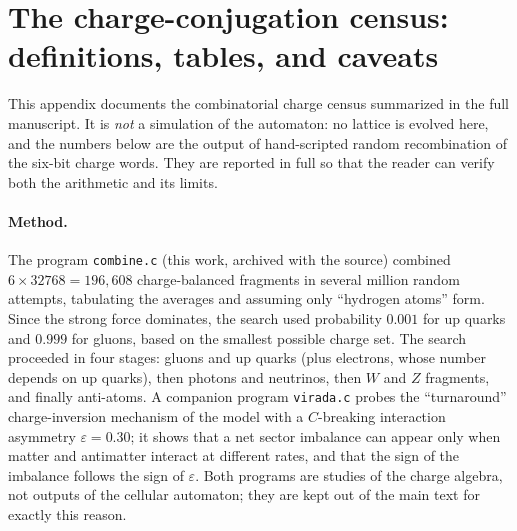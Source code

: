\documentclass{ijuc}
\begin{document}
\section{The charge-conjugation census: definitions, tables, and caveats\label{sec:charge-census-appendix}}
This appendix documents the combinatorial charge census summarized in the full manuscript.  It is \emph{not} a simulation of the automaton: no lattice is evolved here, and the numbers below are the output of hand-scripted random recombination of the six-bit charge words.  They are reported in full so that the reader can verify both the arithmetic and its limits.
\paragraph{Method.} The program \texttt{combine.c} (this work, archived with the source) combined $6\times32768=196{,}608$ charge-balanced fragments in several million random attempts, tabulating the averages and assuming only ``hydrogen atoms'' form.  Since the strong force dominates, the search used probability $0.001$ for up quarks and $0.999$ for gluons, based on the smallest possible charge set.  The search proceeded in four stages: gluons and up quarks (plus electrons, whose number depends on up quarks), then photons and neutrinos, then $W$ and $Z$ fragments, and finally anti-atoms.  A companion program \texttt{virada.c} probes the ``turnaround'' charge-inversion mechanism of the model with a $C$-breaking interaction asymmetry $\varepsilon=0.30$; it shows that a net sector imbalance can appear only when matter and antimatter interact at different rates, and that the sign of the imbalance follows the sign of $\varepsilon$.  Both programs are studies of the charge algebra, not outputs of the cellular automaton; they are kept out of the main text for exactly this reason.
\end{document}
